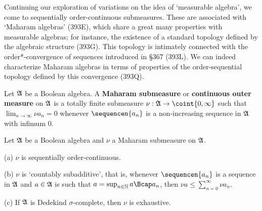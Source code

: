 
\def\chaptername{Measurable algebras}
\def\sectionname{Maharam submeasures}


Continuing our exploration of variations on the idea of `measurable
algebra', we come to sequentially order-continuous submeasures.
These are associated with `Maharam algebras' (393E), which share a great
many properties with measurable algebras;  for instance, the existence of a
standard topology defined by the algebraic structure (393G).   This
topology is intimately connected with the order*-convergence of sequences
introduced in \S367 (393L).   We can indeed characterize Maharam algebras
in terms of properties of
the order-sequential topology defined by this convergence
(393Q).

Let $\frak A$ be a Boolean algebra.   A {\bf
Maharam submeasure} or {\bf continuous outer measure} on $\frak A$ is a
totally finite submeasure $\nu:\frak A\to\coint{0,\infty}$ such that
$\lim_{n\to\infty}\nu a_n=0$ whenever $\sequencen{a_n}$ is a
non-increasing sequence in $\frak A$ with infimum $0$.

Let $\frak A$ be a Boolean algebra and $\nu$ a
Maharam submeasure on $\frak A$.

(a) $\nu$ is sequentially order-continuous.

(b) $\nu$ is `countably subadditive', that is, whenever
$\sequencen{a_n}$ is a sequence in $\frak A$ and $a\in\frak A$ is such
that $a=\sup_{n\in\Bbb N}a\Bcap a_n$, then $\nu
a\le\sum_{n=0}^{\infty}\nu a_n$.

(c) If $\frak A$ is Dedekind $\sigma$-complete, then $\nu$ is
exhaustive.

